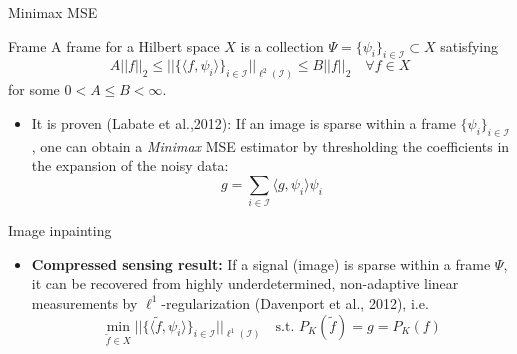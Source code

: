 \begin{frame}{Minimax MSE}

\begin{block}{Frame}
A frame for a Hilbert space $X$ is a collection $\Psi=\{\psi_i\}_{i\in\mathcal{I}}\subset X$ satisfying
$$
A ||f||_2\leq ||\{\langle f,\psi_i\rangle\}_{i\in\mathcal{I}}||_{\ell^2(\mathcal{I})}\leq B||f||_2  \quad \forall f\in X
$$
for some $0<A\leq B<\infty$.
\end{block}

\pause

\begin{itemize}
\bigskip

\bigskip
\item It is proven (Labate et al.,2012): If an image is sparse within a frame $\{\psi_i\}_{i\in \mathcal{I}}$, one can obtain a \textit{Minimax} MSE estimator by thresholding the coefficients in the expansion of the noisy data:
$$
g = \sum_{i\in\mathcal{I}}\langle g,\psi_i\rangle\psi_i
$$
\end{itemize}
\end{frame}

\begin{frame}{Image inpainting}

\begin{itemize}

\begin{block}{\textbf{Goal}}
 Recover an image $f\in X$ from known data:
$$
g = P_K(f)
$$
where $P_K$ is and orthogonal projection onto the known subspace $X_K\triangleleft X$.
\end{block}

\pause
\bigskip

\item  \textbf{Compressed sensing result:} If a signal (image) is sparse within a frame $\Psi$, it can be recovered from highly underdetermined, non-adaptive linear measurements by $\ell^1$-regularization (Davenport et al., 2012), i.e.
$$
\min_{\tilde{f}\in X}||\{\langle\tilde{f},\psi_i\rangle\}_{i\in\mathcal{I}}||_{\ell^1(\mathcal{I})} \quad \text{s.t. }P_K(\tilde{f})=g=P_K(f)
$$

\end{itemize}

\end{frame}

